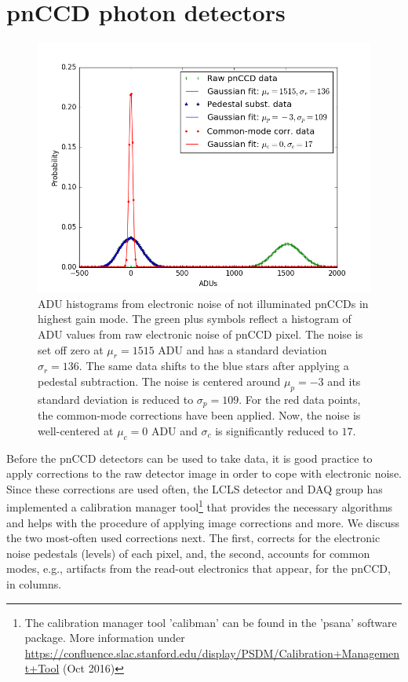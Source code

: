 \section{pnCCD photon detectors}\label{sec:pnccd-corr}
\begin{figure}
	\centering
		\includegraphics[height=0.50\textwidth]{images/pnCCD-electronic-noise.png}
	\caption[ADU histograms from electronic noise of unilluminated pnCCDs.]{ADU histograms from electronic noise of not illuminated pnCCDs in highest gain mode. The green plus symbols reflect a histogram of ADU values from raw electronic noise of pnCCD pixel. The noise is set off zero at $\mu_{r}=1515$ ADU and has a standard deviation $\sigma_{r}=136$. The same data shifts to the blue stars after applying a pedestal subtraction. The noise is centered around $\mu_{p}=-3$ and its standard deviation is reduced to $\sigma_{p}=109$. For the red data points, the common-mode corrections have been applied. Now, the noise is well-centered at $\mu_{c}=0$ ADU and $\sigma_{c}$ is significantly reduced to $17$.}
	\label{fig:pnCCD-electronic-noise}
\end{figure}
Before the pnCCD detectors can be used to take data, it is good practice to apply corrections to the raw detector image in order to cope with electronic noise. Since these corrections are used often, the LCLS detector and DAQ group has implemented a calibration manager tool\footnote{The calibration manager tool 'calibman' can be found in the 'psana' software package. More information under \url{https://confluence.slac.stanford.edu/display/PSDM/Calibration+Management+Tool} (Oct 2016)} that provides the necessary algorithms and helps with the procedure of applying image corrections and more. We discuss the two most-often used corrections next. The first, corrects for the electronic noise pedestals (levels) of each pixel, and, the second, accounts for common modes, e.g., artifacts from the read-out electronics that appear, for the pnCCD, in columns.\\[1\baselineskip]
